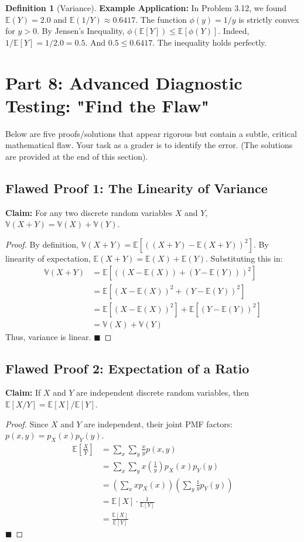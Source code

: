 \documentclass[11pt,letterpaper]{article}
\theoremstyle{definition}
\newtheorem{definition}{Definition}[section]
\theoremstyle{plain}
\theoremstyle{remark}
\newcommand{\E}{\mathbb{E}}
\newcommand{\V}{\mathbb{V}}
\begin{document}
\begin{definition}[Variance]
\textbf{Example Application:} In Problem 3.12, we found $\E(Y) = 2.0$ and $\E(1/Y) \approx 0.6417$. The function $\phi(y) = 1/y$ is strictly convex for $y > 0$. By Jensen's Inequality, $\phi(\E[Y]) \le \E[\phi(Y)]$. 
Indeed, $1/\E[Y] = 1/2.0 = 0.5$. And $0.5 \le 0.6417$. The inequality holds perfectly.

\newpage
\section{Part 8: Advanced Diagnostic Testing: "Find the Flaw"}

Below are five proofs/solutions that appear rigorous but contain a subtle, critical mathematical flaw. Your task as a grader is to identify the error. (The solutions are provided at the end of this section).

\subsection{Flawed Proof 1: The Linearity of Variance}
\textbf{Claim:} For any two discrete random variables $X$ and $Y$, $\V(X + Y) = \V(X) + \V(Y)$.
\begin{proof}
By definition, $\V(X+Y) = \E[((X+Y) - \E(X+Y))^2]$.
By linearity of expectation, $\E(X+Y) = \E(X) + \E(Y)$.
Substituting this in:
\begin{align*}
\V(X+Y) &= \E[((X - \E(X)) + (Y - \E(Y)))^2] \\
&= \E[(X - \E(X))^2 + (Y - \E(Y))^2] \\
&= \E[(X - \E(X))^2] + \E[(Y - \E(Y))^2] \\
&= \V(X) + \V(Y)
\end{align*}
Thus, variance is linear. $\blacksquare$
\end{proof}

\subsection{Flawed Proof 2: Expectation of a Ratio}
\textbf{Claim:} If $X$ and $Y$ are independent discrete random variables, then $\E[X/Y] = \E[X] / \E[Y]$.
\begin{proof}
Since $X$ and $Y$ are independent, their joint PMF factors: $p(x,y) = p_X(x)p_Y(y)$.
\begin{align*}
\E\left[\frac{X}{Y}\right] &= \sum_x \sum_y \frac{x}{y} p(x,y) \\
&= \sum_x \sum_y x \left(\frac{1}{y}\right) p_X(x) p_Y(y) \\
&= \left( \sum_x x p_X(x) \right) \left( \sum_y \frac{1}{y} p_Y(y) \right) \\
&= \E[X] \cdot \frac{1}{\E[Y]} \\
&= \frac{\E[X]}{\E[Y]}
\end{align*}
$\blacksquare$
\end{proof}


\end{definition}
\end{document}
